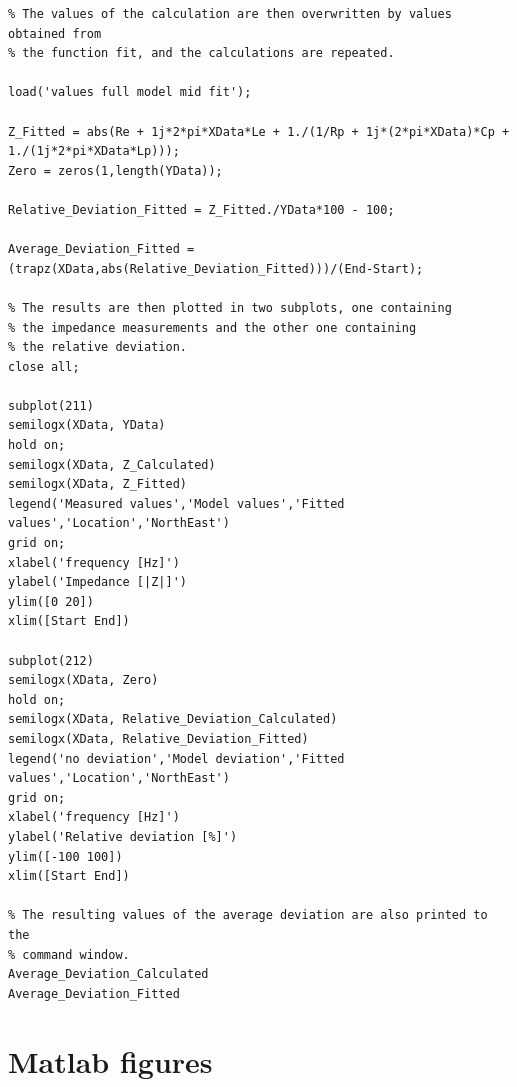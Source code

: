 \documentclass{article}
\begin{document}
\begin{lstlisting}
% The values of the calculation are then overwritten by values obtained from 
% the function fit, and the calculations are repeated.

load('values full model mid fit');

Z_Fitted = abs(Re + 1j*2*pi*XData*Le + 1./(1/Rp + 1j*(2*pi*XData)*Cp + 1./(1j*2*pi*XData*Lp)));
Zero = zeros(1,length(YData));

Relative_Deviation_Fitted = Z_Fitted./YData*100 - 100;

Average_Deviation_Fitted = (trapz(XData,abs(Relative_Deviation_Fitted)))/(End-Start);

% The results are then plotted in two subplots, one containing
% the impedance measurements and the other one containing
% the relative deviation.
close all;

subplot(211)
semilogx(XData, YData)
hold on;
semilogx(XData, Z_Calculated)
semilogx(XData, Z_Fitted)
legend('Measured values','Model values','Fitted values','Location','NorthEast')
grid on;
xlabel('frequency [Hz]')
ylabel('Impedance [|Z|]')
ylim([0 20])
xlim([Start End])

subplot(212)
semilogx(XData, Zero)
hold on;
semilogx(XData, Relative_Deviation_Calculated)
semilogx(XData, Relative_Deviation_Fitted)
legend('no deviation','Model deviation','Fitted values','Location','NorthEast')
grid on;
xlabel('frequency [Hz]')
ylabel('Relative deviation [%]')
ylim([-100 100])
xlim([Start End])

% The resulting values of the average deviation are also printed to the
% command window.
Average_Deviation_Calculated
Average_Deviation_Fitted
\end{lstlisting}

\newpage\section{Matlab figures}
\end{document}
